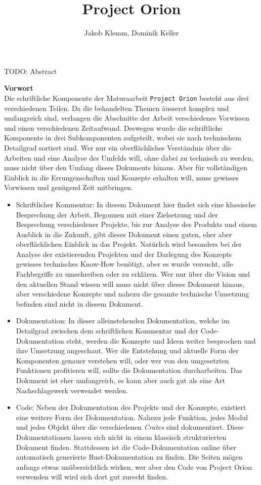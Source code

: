 \documentclass[11pt]{article}
\author{Jakob Klemm, Dominik Keller}
\date{}
\title{Project Orion}
\begin{document}
\maketitle
\tableofcontents

\newpage  
\begin{ABSTRACT}
TODO: Abstract
\end{ABSTRACT}
\newpage

\textbf{Vorwort}\\
Die schriftliche Komponente der Maturaarbeit \texttt{Project Orion} besteht aus
drei verschiedenen Teilen. Da die behandelten Themen äusserst komplex
und umfangreich sind, verlangen die Abschnitte der Arbeit
verschiedenes Vorwissen und einen verschiedenen Zeitaufwand. Deswegen
wurde die schriftliche Komponente in drei Subkomponenten aufgeteilt,
wobei sie nach technischem Detailgrad sortiert sind. Wer nur ein
oberflächliches Verständnis über die Arbeiten und eine Analyse des
Umfelds will, ohne dabei zu technisch zu werden, muss nicht über den
Umfang dieses Dokuments hinaus. Aber für vollständigen Einblick in die
Errungenschaften und Konzepte erhalten will, muss gewisses Vorwissen
und genügend Zeit mitbringen.
\begin{itemize}
\item Schriftlicher Kommentar: In diesem Dokument hier findet sich eine
klassische Besprechung der Arbeit. Begonnen mit einer Zielsetzung
und der Besprechung verschiedener Projekte, bis zur Analyse des
Produkts und einem Ausblick in die Zukunft, gibt dieses Dokument
einen guten, eher aber oberflächlichen Einblick in das Projekt.
Natürlich wird besonders bei der Analyse der existierenden Projekten
und der Darlegung des Konzepts gewisses technisches Know-How
benötigt, aber es wurde versucht, alle Fachbegriffe zu umschreiben
oder zu erklären. Wer nur über die Vision und den aktuellen Stand
wissen will muss nicht über dieses Dokument hinaus, aber
verschiedene Konzepte und nahezu die gesamte technische Umsetzung
befinden sind nicht in diesem Dokument.
\item Dokumentation: In dieser alleinstehenden Dokumentation, welche im
Detailgrad zwischen dem schriftlichen Kommentar und der
Code-Dokumentation steht, werden die Konzepte und Ideen weiter
besprochen und ihre Umsetzung angeschaut. Wer die Entstehung und
aktuelle Form der Komponenten genauer verstehen will, oder wer von
den umgesetzten Funktionen profitieren will, sollte die
Dokumentation durcharbeiten. Das Dokument ist eher umfangreich, es
kann aber auch gut als eine Art Nachschlagewerk verwendet werden.
\item Code: Neben der Dokumentation des Projekts und der Konzepte,
existiert eine weitere Form der Dokumentation. Nahezu jede Funktion,
jedes Modul und jedes Objekt über die verschiedenen \emph{Crates} sind
dokumentiert. Diese Dokumentationen lassen sich nicht in einem
klassisch strukturierten Dokument finden. Stattdessen ist die
Code-Dokumentation online über automatisch generierte
Rust-Dokumentation zu finden. Die Seiten mögen anfangs etwas
unübersichtlich wirken, wer aber den Code von Project Orion
verwenden will wird sich dort gut zurecht finden.
\end{itemize}
\newpage
\end{document}
